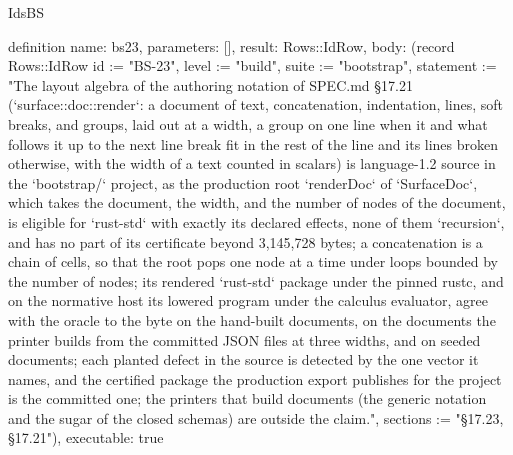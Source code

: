 \begin{lexlean}{IdsBS}
\begin{semanticmodule}
definition{
  name: bs23,
  parameters: [],
  result: Rows::IdRow,
  body: (record Rows::IdRow {id := "BS-23", level := "build", suite := "bootstrap", statement := "The layout algebra of the authoring notation of SPEC.md §17.21 (`surface::doc::render`: a document of text, concatenation, indentation, lines, soft breaks, and groups, laid out at a width, a group on one line when it and what follows it up to the next line break fit in the rest of the line and its lines broken otherwise, with the width of a text counted in scalars) is language-1.2 source in the `bootstrap/` project, as the production root `renderDoc` of `SurfaceDoc`, which takes the document, the width, and the number of nodes of the document, is eligible for `rust-std` with exactly its declared effects, none of them `recursion`, and has no part of its certificate beyond 3,145,728 bytes; a concatenation is a chain of cells, so that the root pops one node at a time under loops bounded by the number of nodes; its rendered `rust-std` package under the pinned rustc, and on the normative host its lowered program under the calculus evaluator, agree with the oracle to the byte on the hand-built documents, on the documents the printer builds from the committed JSON files at three widths, and on seeded documents; each planted defect in the source is detected by the one vector it names, and the certified package the production export publishes for the project is the committed one; the printers that build documents (the generic notation and the sugar of the closed schemas) are outside the claim.", sections := "§17.23, §17.21"}),
  executable: true
}


\end{semanticmodule}
\end{lexlean}
